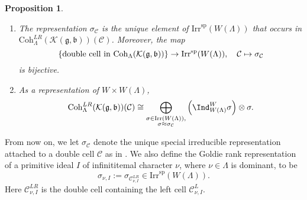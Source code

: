 \documentclass[12pt]{amsart}
\newcommand{\CB}{{\mathcal {B}}}
\newcommand{\CC}{{\mathcal {C}}}
\newcommand{\CK}{{\mathcal {K}}}
\newcommand{\g}{\mathfrak g}
\renewcommand{\b}{\mathfrak b}
\numberwithin{equation}{section}
\newtheorem{prop}[thm]{Proposition}
\theoremstyle{remark}
\def\Irr{\mathrm{Irr}}
\def\Coh{\mathrm{Coh}}
\begin{document}
\begin{prop}
\begin{enumerate}[label=(\alph*),wide=0pt]
 \item The representation
$\sigma_\CC$ is the unique
element of $\Irr^{\mathrm{sp}}(W(\Lambda))$
that occurs in $\Coh^{LR}_{\Lambda}( \CK(\g,\b))( \CC)$. Moreover, the map
\[
  \{\textrm{double cell in $ \Coh_{\Lambda}( \CK(\g,\b))$}\}\rightarrow \Irr^{\mathrm{sp}}(W(\Lambda)), \quad \CC\mapsto \sigma_\CC
\]
is bijective.
\item
As a representation of $W\times W(\Lambda)$,
\[
 \Coh^{LR}_{\Lambda}( \CK(\g,\b))( \CC)\cong \bigoplus_{
 \substack{\sigma\in \Irr(W(\Lambda)),\\
 \sigma\approx \sigma_\CC}}
  \left(\Ind_{W(\Lambda)}^W\sigma\right)\otimes \sigma.
\]
\end{enumerate}
\end{prop}



From now on, we let $\sigma_\CC$ denote the unique special irreducible representation attached to a double cell $\CC$ as in .
We also define the Goldie rank representation of a primitive ideal $I$ of infinititemal character $\nu$,  where $\nu \in \Lambda$ is dominant, to be
\begin{equation}\label{grrj}
\sigma_{\nu, I}:=\sigma_{\CC^{LR}_{\nu,I} }\in \Irr^{\mathrm{sp}}(W(\Lambda)).
\end{equation}
Here $\CC^{LR}_{\nu,I}$ is the double cell containing the left cell $\CC^L_{\nu, I}$.
\end{document}

